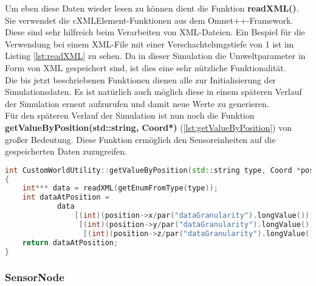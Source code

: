 Um eben diese Daten wieder lesen zu können dient die Funktion \textbf{readXML()}. Sie verwendet die cXMLElement-Funktionen aus dem Omnet++-Framework. Diese sind sehr hilfreich beim Verarbeiten von XML-Dateien. Ein Bespiel für die Verwendung bei einem XML-File mit einer Verschachtelungstiefe von 1 ist im Listing \ref{lst:readXML} zu sehen. Da in dieser Simulation die Umweltparameter in Form von XML gespeichert sind, ist dies eine sehr nützliche Funktionalität.\\
Die bis jetzt beschriebenen Funktionen dienen alle zur Initialisierung der Simulationsdaten. Es ist natürlich auch möglich diese in einem späteren Verlauf der Simulation erneut aufzurufen und damit neue Werte zu generieren. \\
Für den späteren Verlauf der Simulation ist nun noch die Funktion \textbf{getValueByPosition(std::string, Coord*)} (\ref{lst:getValueByPosition}) von großer Bedeutung. Diese Funktion ermöglich den Sensoreinheiten auf die gespeicherten Daten zuzugreifen.

\begin{lstlisting}[language=C++, label=lst:getValueByPosition, caption=getValueByPosition()]
int CustomWorldUtility::getValueByPosition(std::string type, Coord *position)
{
    int*** data = readXML(getEnumFromType(type));
    int dataAtPosition =
            data
                [(int)(position->x/par("dataGranularity").longValue())]
                 [(int)(position->y/par("dataGranularity").longValue())]
                  [(int)(position->z/par("dataGranularity").longValue())];
    return dataAtPosition;
}
\end{lstlisting}

\subsubsection{SensorNode}

